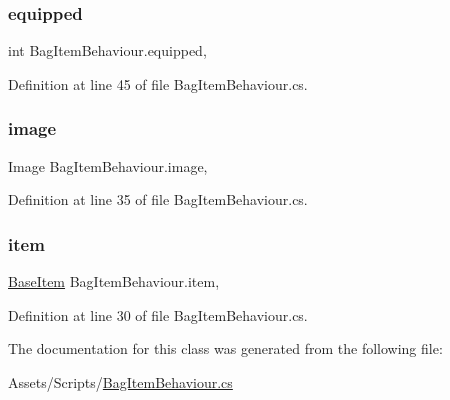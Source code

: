 \mbox{\label{class_bag_item_behaviour_a7772dc51a9cde63e29f6a683f8fbb451}} 
\subsubsection{\texorpdfstring{equipped}{equipped}}
{\footnotesize\ttfamily int Bag\+Item\+Behaviour.\+equipped\hspace{0.3cm}{\ttfamily [get]}, {\ttfamily [set]}}



Definition at line 45 of file Bag\+Item\+Behaviour.\+cs.

\mbox{\label{class_bag_item_behaviour_a10d2d4e2b468574fb4f922da7f300cbc}} 
\subsubsection{\texorpdfstring{image}{image}}
{\footnotesize\ttfamily Image Bag\+Item\+Behaviour.\+image\hspace{0.3cm}{\ttfamily [get]}, {\ttfamily [set]}}



Definition at line 35 of file Bag\+Item\+Behaviour.\+cs.

\mbox{\label{class_bag_item_behaviour_aae12bd30d28c11b793bd8db232e9c2a2}} 
\subsubsection{\texorpdfstring{item}{item}}
{\footnotesize\ttfamily \mbox{\hyperlink{class_base_item}{Base\+Item}} Bag\+Item\+Behaviour.\+item\hspace{0.3cm}{\ttfamily [get]}, {\ttfamily [set]}}



Definition at line 30 of file Bag\+Item\+Behaviour.\+cs.



The documentation for this class was generated from the following file\+:\begin{DoxyCompactItemize}
\item 
Assets/\+Scripts/\mbox{\hyperlink{_bag_item_behaviour_8cs}{Bag\+Item\+Behaviour.\+cs}}\end{DoxyCompactItemize}
